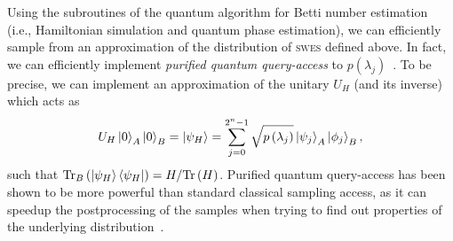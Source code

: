 \documentclass[a4paper, onecolumn, accepted=2022-08-28]{quantumarticle}
\newcommand{\Tr}{\mbox{\rm Tr}}
\newcommand{\tr}[1]{\Tr\left(#1\right)}
\begin{document}
Using the subroutines of the quantum algorithm for Betti number estimation (i.e., Hamiltonian simulation and quantum phase estimation), we can efficiently sample from an approximation of the distribution of \textsc{swes} defined above.
In fact, we can efficiently implement \emph{purified quantum query-access} to $p(\lambda_j)$~\cite{gilyen:entropy}.
To be precise, we can implement an approximation of the unitary $U_H$ (and its inverse) which acts as
\begin{align}
U_H \ket{0}_A\ket{0}_B = \ket{\psi_H} = \sum_{j = 0}^{2^n-1}\sqrt{p\left( \lambda_j\right)}\ket{\psi_j}_A\ket{\phi_j}_B,
\label{eq:quantum_access}
\end{align}
such that $\Tr_B\left(\ket{\psi_H}\bra{\psi_H}\right) = H / \tr{H}$.
Purified quantum query-access has been shown to be more powerful than standard classical sampling access, as it can speedup the postprocessing of the samples when trying to find out properties of the underlying distribution~\cite{gilyen:entropy}.
\end{document}
